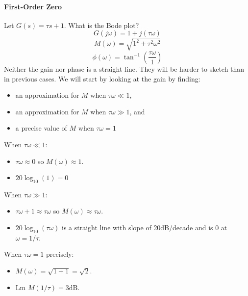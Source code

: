 \documentclass{book}
\newcommand{\jw}{j\omega}
\newcommand{\Lm}{\textrm{Lm }}
\begin{document}
\paragraph*{First-Order Zero}
Let $ G(s) = \tau s+1 $. What is the Bode plot?
\[ G(\jw) = 1+j(\tau\omega) \]
\[ M(\omega) = \sqrt{1^2+\tau^2\omega^2}\]
\[ \phi(\omega) = \tan^{-1}\left(\frac{\tau\omega}{1}\right) \]
Neither the gain nor phase is a straight line. They will be harder to sketch than in previous cases. We will start by looking at the gain by finding:
\begin{itemize}
	\item an approximation for $ M $ when $ \tau\omega \ll 1 $,
	\item an approximation for $ M $ when $ \tau\omega \gg 1 $, and
	\item a precise value of $ M $ when $ \tau\omega = 1 $
\end{itemize}
When $ \tau\omega \ll 1 $: 
\begin{itemize}
	\item $ \tau\omega\approx0 $ so $ M(\omega) \approx 1 $.
	\item $ 20\log_{10}(1) = 0 $
\end{itemize}
When $ \tau\omega \gg 1 $: 
\begin{itemize}
	\item $ \tau\omega+1\approx\tau\omega $ so $ M(\omega) \approx \tau\omega $.
	\item $ 20\log_{10}(\tau\omega) $ is a straight line with slope of 20dB/decade and is 0 at $ \omega=1/\tau $.
\end{itemize}
When $ \tau\omega = 1 $ precisely:
\begin{itemize}
	\item $ M(\omega) = \sqrt{1+1} = \sqrt 2$.
	\item $ \Lm M(1/\tau) = 3 $dB.
\end{itemize}
\end{document}
